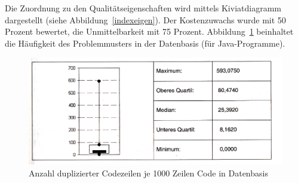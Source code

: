 \documentclass[da,ngerman]{stthesis}
\begin{document}
				Die Zuordnung zu den Qualitätseigenschaften wird mittels Kiviatdiagramm dargestellt (siehe Abbildung~\ref{indexeigen}). Der Kostenzuwachs wurde mit 50 Prozent bewertet, die Unmittelbarkeit mit 75 Prozent. Abbildung~\ref{indexschwell} beinhaltet die Häufigkeit des Problemmusters in der Datenbasis (für Java-Programme). \newline
				\begin{figure} [h]
					\centering
					\includegraphics [width=\textwidth] {indexschwellwerte.png}
					\caption{Anzahl duplizierter Codezeilen je 1000 Zeilen Code in Datenbasis \cite{CodeQualityManagement}}
					\label{indexschwell}
				\end{figure}
\end{document}
